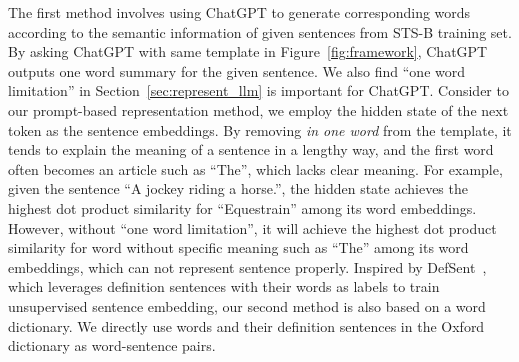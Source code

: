 \documentclass{article}
\begin{document}
The first method involves using ChatGPT to generate corresponding words according to the semantic information of given sentences from STS-B training set.
By asking ChatGPT with same template in Figure~\ref{fig:framework}, ChatGPT outputs one word summary for the given sentence.
We also find ``one word limitation''  in Section~\ref{sec:represent_llm} is important for ChatGPT.
Consider to our prompt-based representation method, we employ the hidden state of the next token as the sentence embeddings.
By removing \textit{in one word} from the template, it tends to explain the meaning of a sentence in a lengthy way, and the first word often becomes an article such as ``The'', which lacks clear meaning.
For example,
given the sentence ``A jockey riding a horse.'',
the hidden state achieves the highest dot product similarity for ``Equestrain'' among its word embeddings.
However, without ``one word limitation'', it will achieve the highest dot product similarity for word without specific meaning such as ``The'' among its word embeddings, which can not represent sentence properly.
Inspired by DefSent~\cite{tsukagoshi-etal-2021-defsent}, which leverages definition sentences with their words as labels to train unsupervised sentence embedding,
our second method is also based on a word dictionary. We directly use words and their definition sentences in the Oxford dictionary as word-sentence pairs.

\end{document}
